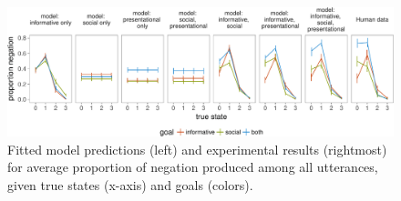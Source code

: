 \documentclass[12pt]{article}
\begin{document}
\begin{figure}[!h]
\includegraphics[width=\textwidth]{polite_manuscript_files/figure-latex/negation-1} \caption{Fitted model predictions (left) and experimental results (rightmost) for average proportion of negation produced among all utterances, given true states (x-axis) and goals (colors).}\label{fig:negation}
\end{figure}






%
\end{document}

